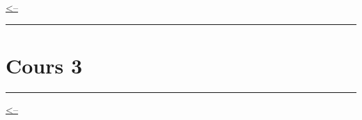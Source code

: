 \href{../README.md}{\textless--}

\begin{center}\rule{0.5\linewidth}{0.5pt}\end{center}

\section{Cours 3}\label{cours-3}

\begin{center}\rule{0.5\linewidth}{0.5pt}\end{center}

\href{../README.md}{\textless--}
